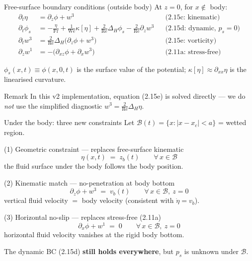 \documentclass[aspectratio=169, 10pt]{beamer}
\newcommand{\Fr}{\mathrm{Fr}}
\newcommand{\We}{\mathrm{We}}
\newcommand{\Rey}{\mathrm{Re}}
\begin{document}
\begin{frame}{Free-surface boundary conditions (outside body)}
At $z=0$, for $x \notin$ body:
\begin{align}
  \partial_t \eta &= \partial_z \phi + w^3 &&\text{(2.15c: kinematic)} \\[-0.2em]
  \partial_t \phi_s &= -\tfrac{\eta}{\Fr} + \tfrac{1}{\We}\kappa[\eta]
      + \tfrac{2}{\Rey}\Delta_H \phi_s - \tfrac{2}{\Rey} \partial_z w^3 &&\text{(2.15d: dynamic, $p_s=0$)} \\[-0.2em]
  \partial_t w^3 &= \tfrac{2}{\Rey}\Delta_H\!\big(\partial_z \phi + w^3\big) &&\text{(2.15e: vorticity)}\\[-0.2em]
  \partial_z w^1 &= -\big(\partial_{xz}\phi + \partial_x w^3\big) &&\text{(2.11a: stress-free)}
\end{align}

\vspace{0.3em}
\small
$\phi_s(x,t) \equiv \phi(x,0,t)$ is the surface value of the potential; $\kappa[\eta] \approx \partial_{xx}\eta$ is the linearised curvature.
\vspace{0.5em}

\begin{alertblock}{Remark}
In this v2 implementation, \alert{equation (2.15e) is solved directly} — we do \emph{not} use the simplified diagnostic $w^3 = \tfrac{2}{\Rey}\Delta_H \eta$.
\end{alertblock}
\end{frame}

\begin{frame}{Under the body: three new constraints}
\footnotesize Let $\mathcal{B}(t) = \{x : |x - x_c| < a\}$ = wetted region.

\begin{block}{(1) Geometric constraint — replaces free-surface kinematic}
\[
\eta(x,t) \;=\; z_b(t) \qquad \forall\, x \in \mathcal{B}
\]
the fluid surface under the body follows the body position.
\end{block}

\begin{block}{(2) Kinematic match — no-penetration at body bottom}
\[
\partial_z \phi + w^3 \;=\; v_b(t) \qquad \forall\, x \in \mathcal{B},\ z=0
\]
vertical fluid velocity $=$ body velocity (consistent with $\dot\eta = v_b$).
\end{block}

\begin{block}{(3) Horizontal no-slip — replaces stress-free (2.11a)}
\[
\partial_x \phi + w^1 \;=\; 0 \qquad \forall\, x \in \mathcal{B},\ z=0
\]
horizontal fluid velocity vanishes at the rigid body bottom.
\end{block}

The dynamic BC (2.15d) \textbf{still holds everywhere}, but $p_s$ is unknown under $\mathcal{B}$.
\end{frame}
\end{document}
